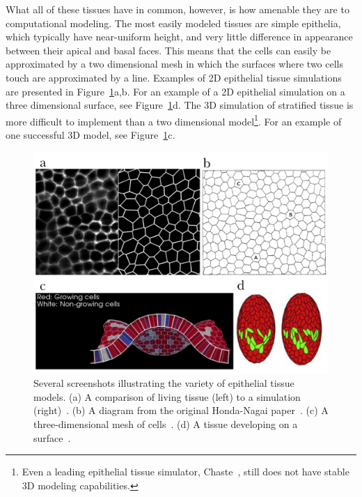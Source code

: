 What all of these tissues have in common, however, is how amenable they are to computational modeling. The most easily modeled tissues are simple epithelia, which typically have near-uniform height, and very little difference in appearance between their apical and basal faces. This means that the cells can easily be approximated by a two dimensional mesh in which the surfaces where two cells touch are approximated by a line. Examples of 2D epithelial tissue simulations are presented in Figure~\ref{fig:fourgraphs}a,b. For an example of a 2D epithelial simulation on a three dimensional surface, see Figure~\ref{fig:fourgraphs}d. The 3D simulation of stratified tissue is more difficult to implement than a two dimensional model\footnote{Even a leading epithelial tissue simulator, Chaste~\cite{ChasteMain}, still does not have stable 3D modeling capabilities.}. For an example of one successful 3D model, see Figure~\ref{fig:fourgraphs}c.

\begin{figure}[ht]
    \centering
    \includegraphics[width=\textwidth]{../diagrams/abcd3.pdf}
    \caption[Various Models of Epithelial Tissue]{Several screenshots illustrating the variety of epithelial tissue models. (a) A comparison of living tissue (left) to a simulation (right)~\cite{Yoshi}. (b) A diagram from the original Honda-Nagai paper~\cite{HondaNagai}. (c) A three-dimensional mesh of cells~\cite{Okuda1}. (d) A tissue developing on a surface~\cite{VertexModels}.}
    \label{fig:fourgraphs}
\end{figure}

